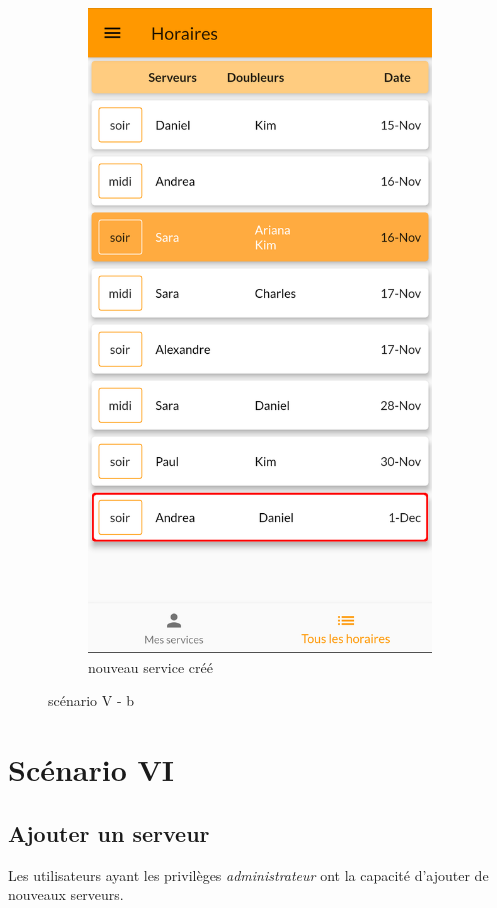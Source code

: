 \begin{center}
\begin{figure}[h]
\begin{subfigure}{.45\textwidth}
            \includegraphics[width=0.6\linewidth]{screenshots/scenario_05/ajout_service_done.png}
            \caption{nouveau service créé}
            \label{fig:ajout_service_done}
        \end{subfigure}
        \caption{scénario V - b}
        \label{fig:scen05b}
    \end{figure}
\end{center}
\newpage
\section[Ajouter un serveur - Scénario VI]{Scénario VI}
    \subsection*{Ajouter un serveur}
    Les utilisateurs ayant les privilèges \textit{administrateur} ont la capacité
    d'ajouter de nouveaux serveurs.

